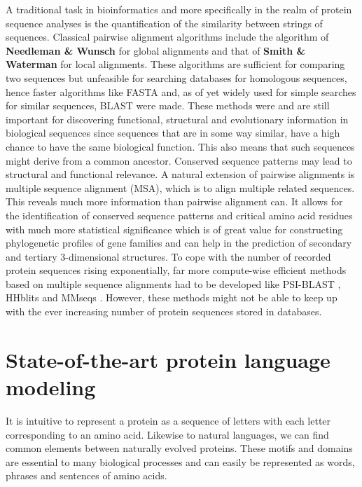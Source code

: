 A traditional task in bioinformatics and more specifically in the realm of protein sequence analyses is the quantification of the similarity between strings of sequences. Classical pairwise alignment algorithms include the algorithm of \textbf{Needleman \& Wunsch} \cite{global} for global alignments and that of \textbf{Smith \& Waterman} \cite{local} for local alignments. These algorithms are sufficient for comparing two sequences but unfeasible for searching databases for homologous sequences, hence faster algorithms like FASTA \cite{fasta} and, as of yet widely used for simple searches for similar sequences, BLAST \cite{blast} were made. These methods were and are still important for discovering functional, structural and evolutionary information in biological sequences since sequences that are in some way similar, have a high chance to have the same biological function. This also means that such sequences might derive from a common ancestor. Conserved sequence patterns may lead to structural and functional relevance. A natural extension of pairwise alignments is multiple sequence alignment (MSA), which is to align multiple related sequences. This reveals much more information than pairwise alignment can. It allows for the identification of conserved sequence patterns and critical amino acid residues with much more statistical significance which is of great value for constructing phylogenetic profiles of gene families and can help in the prediction of secondary and tertiary 3-dimensional structures. To cope with the number of recorded protein sequences rising exponentially, far more compute-wise efficient methods based on multiple sequence alignments had to be developed like PSI-BLAST \cite{psiblast}, HHblits \cite{hhblits3} and MMseqs \cite{mmseqs2}. However, these methods might not be able to keep up with the ever increasing number of protein sequences stored in databases.

\section{State-of-the-art protein language modeling}
It is intuitive to represent a protein as a sequence of letters with each letter corresponding to an amino acid. Likewise to natural languages, we can find common elements between naturally evolved proteins. These motifs and domains are essential to many biological processes and can easily be represented as words, phrases and sentences of amino acids.


